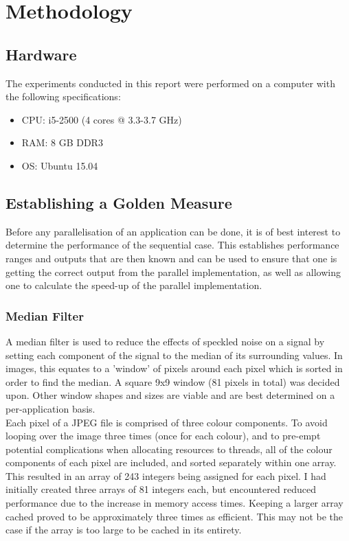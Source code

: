 \section{Methodology}

\subsection{Hardware}
The experiments conducted in this report were performed on a computer with the following specifications:
\begin{itemize}
	\item CPU: i5-2500 (4 cores @ 3.3-3.7 GHz)
	\item RAM: 8 GB DDR3
	\item OS:  Ubuntu 15.04
\end{itemize}

\subsection{Establishing a Golden Measure}

Before any parallelisation of an application can be done, it is of best interest to determine the performance of the sequential case. This establishes performance ranges and outputs that are then known and can be used to ensure that one is getting the correct output from the parallel implementation, as well as allowing one to calculate the speed-up of the parallel implementation.

\subsubsection{Median Filter}
A median filter is used to reduce the effects of speckled noise on a signal by setting each component of the signal to the median of its surrounding values. In images, this equates to a 'window' of pixels around each pixel which is sorted in order to find the median. A square 9x9 window (81 pixels in total) was decided upon. Other window shapes and sizes are viable and are best determined on a per-application basis. \\

Each pixel of a JPEG file is comprised of three colour components. To avoid looping over the image three times (once for each colour), and to pre-empt potential complications when allocating resources to threads, all of the colour components of each pixel are included, and sorted separately within one array. This resulted in an array of 243 integers being assigned for each pixel. I had initially created three arrays of 81 integers each, but encountered reduced performance due to the increase in memory access times. Keeping a larger array cached proved to be approximately three times as efficient. This may not be the case if the array is too large to be cached in its entirety.


